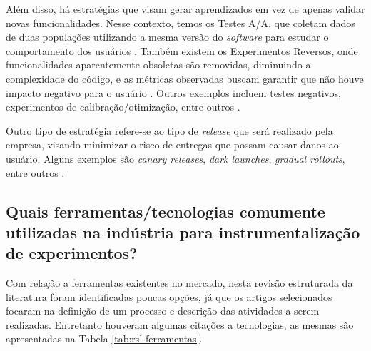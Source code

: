 Além disso, há estratégias que visam gerar aprendizados em vez de apenas validar novas funcionalidades. Nesse contexto, temos os Testes A/A, que coletam dados de duas populações utilizando a mesma versão do \textit{software} para estudar o comportamento dos usuários \cite{fabijan_evolution_2017} \cite{fabijan_three_2019} \cite{kuhrmann_activity_2018} \cite{crook_seven_2009} \cite{fabijan_benefits_2017}. Também existem os Experimentos Reversos, onde funcionalidades aparentemente obsoletas são removidas, diminuindo a complexidade do código, e as métricas observadas buscam garantir que não houve impacto negativo para o usuário \cite{fabijan_benefits_2017}. Outros exemplos incluem testes negativos, experimentos de calibração/otimização, entre outros \cite{kohavi_online_2013} \cite{issa_mattos_hurrier_2023}.

Outro tipo de estratégia refere-se ao tipo de \textit{release} que será realizado pela empresa, visando minimizar o risco de entregas que possam causar danos ao usuário. Alguns exemplos são \textit{canary releases}, \textit{dark launches}, \textit{gradual rollouts}, entre outros \cite{chen_understanding_2024} \cite{issa_mattos_hurrier_2023} \cite{bures_infrastructure_2021}.

\subsection{Quais ferramentas/tecnologias comumente utilizadas na indústria para instrumentalização de experimentos?}

Com relação a ferramentas existentes no mercado, nesta revisão estruturada da literatura foram identificadas poucas opções, já que os artigos selecionados focaram na definição de um processo e descrição das atividades a serem realizadas. Entretanto houveram algumas citações a tecnologias, as mesmas são apresentadas na Tabela \ref{tab:rsl-ferramentas}.

